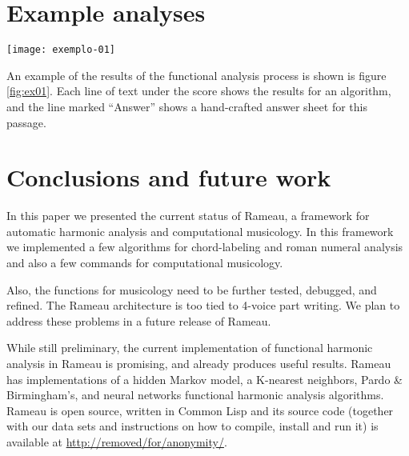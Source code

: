 \section{Example analyses}
\label{sec:example-analyses}

\begin{figure*}[t]
  \centering
  \texttt{[image: exemplo-01]}
  \caption{An excerpt of the analysis of Bach chorale \#20.}
  \label{fig:ex01}
\end{figure*}

An example of the results of the functional analysis process is shown
is figure \ref{fig:ex01}. Each line of text under the score shows the
results for an algorithm, and the line marked ``Answer'' shows a
hand-crafted answer sheet for this passage.

\section{Conclusions and future work}
\label{sec:concl-future-work}

In this paper we presented the current status of Rameau, a framework
for automatic harmonic analysis and computational musicology. In this
framework we implemented a few algorithms for chord-labeling and roman
numeral analysis and also a few commands for computational musicology.

Also, the functions for musicology need to be further tested,
debugged, and refined. The Rameau architecture is too tied to 4-voice
part writing. We plan to address these problems in a future release of
Rameau.

While still preliminary, the current implementation of functional
harmonic analysis in Rameau is promising, and already produces useful
results. Rameau has implementations of a hidden Markov model, a
K-nearest neighbors, Pardo \& Birmingham's, and neural networks
functional harmonic analysis algorithms. Rameau is open source,
written in Common Lisp and its source code (together with our data
sets and instructions on how to compile, install and run it) is
available at \url{http://removed/for/anonymity/}.

